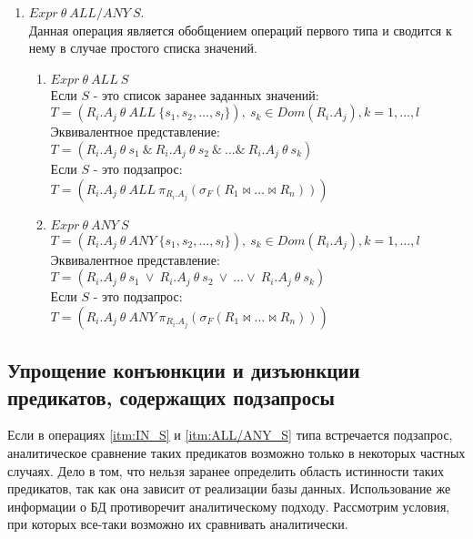 \documentclass[10pt,a4paper]{article}
\def \n #1{\mathit{#1}}
\begin{document}
\begin{enumerate}
\item \label{itm:ALL/ANY_S} $\n{Expr}\ \theta\ \n{ALL/ANY}\ S$.\\
Данная операция является обобщением операций первого типа и сводится к нему в случае простого списка
значений.
\begin{enumerate}[label=\Roman*]
  \item $\n{Expr}\ \theta\ \n{ALL}\ S$\\ Если $S$ - это список заранее заданных значений:\\
  $T = (\n{R_i.A_j}\ \theta\ \n{ALL}\ \{s_1, s_2, \dots, s_l \}),\ s_k \in Dom(R_i.A_j), k = 1,
  \dots, l$\\  
  Эквивалентное представление:\\
  $T = (\n{R_i.A_j}\ \theta\ s_1\ \&\ \n{R_i.A_j}\ \theta\ s_2\ \&\ \dots \&\ \n{R_i.A_j}\ \theta\
  s_k)$\\
  Если $S$ - это подзапрос:\\
  $T = (\n{R_i.A_j}\ \theta\ \n{ALL}\ \pi_{R_i.A_j} (\sigma_F (R_1 \Join \dots \Join R_n)))$\\
  \item $\n{Expr}\ \theta\ \n{ANY}\ S$\\
  $T = (\n{R_i.A_j}\ \theta\ \n{ANY}\ \{s_1, s_2, \dots, s_l \}),\ s_k \in Dom(R_i.A_j), k = 1,
  \dots, l$\\  
  Эквивалентное представление:\\
  $T = (\n{R_i.A_j}\ \theta\ s_1\ \vee\ \n{R_i.A_j}\ \theta\ s_2\ \vee\ \dots \vee\ \n{R_i.A_j}\
  \theta\ s_k)$\\
  Если $S$ - это подзапрос:\\
  $T = (\n{R_i.A_j}\ \theta\ \n{ANY}\ \pi_{R_i.A_j} (\sigma_F (R_1 \Join \dots \Join R_n)))$\\
\end{enumerate}
\end{enumerate}

\subsection{Упрощение конъюнкции и дизъюнкции предикатов, содержащих подзапросы}
Если в операциях \ref{itm:IN_S} и \ref{itm:ALL/ANY_S} типа встречается подзапрос,
аналитическое сравнение таких предикатов возможно только в некоторых частных случаях. Дело в том,
что нельзя заранее определить область истинности таких предикатов, так как она зависит от реализации
базы данных. Использование же информации о БД противоречит аналитическому подходу. Рассмотрим
условия, при которых все-таки возможно их сравнивать аналитически.
\end{document}
